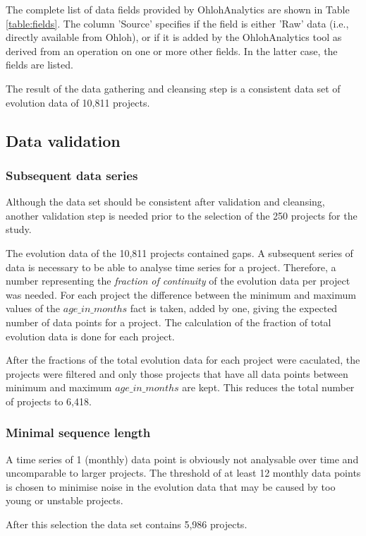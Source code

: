 The complete list of data fields provided by OhlohAnalytics are shown in Table
\ref{table:fields}. The column 'Source' specifies if the field is either 'Raw'
data (i.e., directly available from Ohloh), or if it is added by the
OhlohAnalytics tool as derived from an operation on one or more other fields.
In the latter case, the fields are listed.

The result of the data gathering and cleansing step is a consistent data set of
evolution data of 10,811 projects.



\subsection{Data validation}
\subsubsection{Subsequent data series}
Although the data set should be consistent after validation and cleansing,
another validation step is needed prior to the selection of the 250 projects
for the study.

The evolution data of the 10,811 projects contained gaps. A subsequent series of
data is necessary to be able to analyse time series for a project.
Therefore, a number representing the \emph{fraction of continuity }\rm of the
evolution data per project was needed. For each project the difference between
the minimum and maximum values of the $age\_in\_months$ fact is taken, added by
one, giving the expected number of data points for a project. The calculation of
the fraction of total evolution data is done for each project.

After the fractions of the total evolution data for each project were caculated,
the projects were filtered and only those projects that have all data points
between minimum and maximum $age\_in\_months$ are kept. This reduces the total
number of projects to 6,418.

\subsubsection{Minimal sequence length}
A time series of 1 (monthly) data point is obviously not analysable over time
and uncomparable to larger projects. The threshold of at least 12 monthly data
points is chosen to minimise noise in the evolution data that may be caused by
too young or unstable projects.

After this selection the data set contains 5,986 projects.

